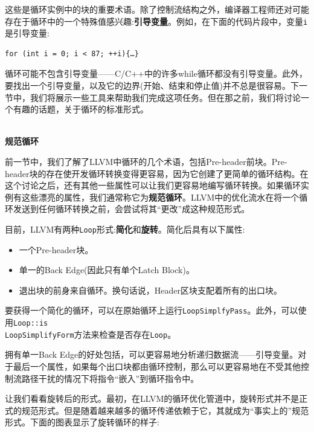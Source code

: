这些是循环实例中的块的重要术语。除了控制流结构之外，编译器工程师还对可能存在于循环中的一个特殊值感兴趣:\textbf{引导变量}。例如，在下面的代码片段中，变量\texttt{i}是引导变量:

\begin{lstlisting}[style=styleCXX]
for (int i = 0; i < 87; ++i){…}
\end{lstlisting}

循环可能不包含引导变量——C/C++中的许多while循环都没有引导变量。此外，要找出一个引导变量，以及它的边界(开始、结束和停止值)并不总是很容易。下一节中，我们将展示一些工具来帮助我们完成这项任务。但在那之前，我们将讨论一个有趣的话题，关于循环的标准形式。

\hspace*{\fill} \\ %
\noindent
\textbf{规范循环}

前一节中，我们了解了LLVM中循环的几个术语，包括Pre-header前块。Pre-header块的存在使开发循环转换变得更容易，因为它创建了更简单的循环结构。在这个讨论之后，还有其他一些属性可以让我们更容易地编写循环转换。如果循环实例有这些漂亮的属性，我们通常称它为\textbf{规范循环}。LLVM中的优化流水在将一个循环发送到任何循环转换之前，会尝试将其“更改”成这种规范形式。

目前，LLVM有两种\texttt{Loop}形式:\textbf{简化}和\textbf{旋转}。简化后具有以下属性:

\begin{itemize}
\item 一个Pre-header块。
\item 单一的Back Edge(因此只有单个Latch Block)。
\item 退出块的前身来自循环。换句话说，Header区块支配着所有的出口块。
\end{itemize}

要获得一个简化的循环，可以在原始循环上运行\texttt{LoopSimplfyPass}。此外，可以使用\texttt{Loop::is\\LoopSimplifyForm}方法来检查是否存在\texttt{Loop}。

拥有单一Back Edge的好处包括，可以更容易地分析递归数据流——引导变量。对于最后一个属性，如果每个出口块都由循环控制，那么可以更容易地在不受其他控制流路径干扰的情况下将指令“嵌入”到循环指令中。

让我们看看旋转后的形式。最初，在LLVM的循环优化管道中，旋转形式并不是正式的规范形式。但是随着越来越多的循环传递依赖于它，其就成为“事实上的”规范形式。下面的图表显示了旋转循环的样子:

